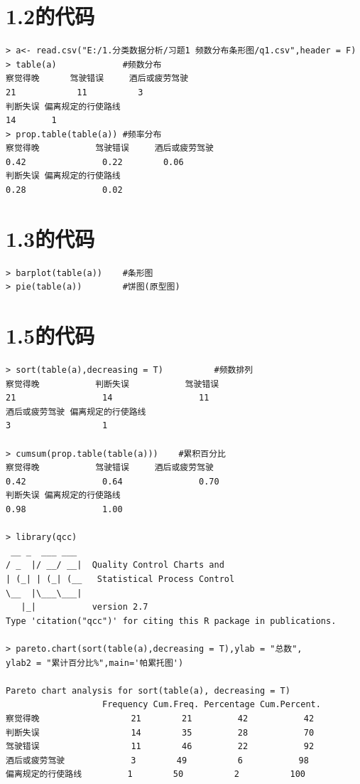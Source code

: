 \documentclass[11pt,a4paper]{ctexart}
\begin{document}
\begin{appendices}

\section{1.2的代码}
\begin{lstlisting}
> a<- read.csv("E:/1.分类数据分析/习题1 频数分布条形图/q1.csv",header = F)
> table(a)             #频数分布
察觉得晚      驾驶错误     酒后或疲劳驾驶 
21            11          3 
判断失误 偏离规定的行使路线 
14       1 
> prop.table(table(a)) #频率分布
察觉得晚           驾驶错误     酒后或疲劳驾驶 
0.42               0.22        0.06 
判断失误 偏离规定的行使路线 
0.28               0.02 
\end{lstlisting}
\section{1.3的代码}
\begin{lstlisting}
> barplot(table(a))    #条形图
> pie(table(a))        #饼图(原型图)
\end{lstlisting}

\section{1.5的代码}
\begin{lstlisting}
> sort(table(a),decreasing = T)          #频数排列
察觉得晚           判断失误           驾驶错误 
21                 14                 11 
酒后或疲劳驾驶 偏离规定的行使路线 
3                  1 

> cumsum(prop.table(table(a)))    #累积百分比
察觉得晚           驾驶错误     酒后或疲劳驾驶 
0.42               0.64               0.70 
判断失误 偏离规定的行使路线 
0.98               1.00 

> library(qcc)
 __ _  ___ ___ 
/ _  |/ __/ __|  Quality Control Charts and 
| (_| | (_| (__   Statistical Process Control
\__  |\___\___|
   |_|           version 2.7
Type 'citation("qcc")' for citing this R package in publications.

> pareto.chart(sort(table(a),decreasing = T),ylab = "总数",
ylab2 = "累计百分比%",main='帕累托图')

Pareto chart analysis for sort(table(a), decreasing = T)
                   Frequency Cum.Freq. Percentage Cum.Percent.
察觉得晚                  21        21         42           42
判断失误                  14        35         28           70
驾驶错误                  11        46         22           92
酒后或疲劳驾驶             3        49          6           98
偏离规定的行使路线         1        50          2          100


\end{lstlisting}
\end{appendices}
\end{document}
